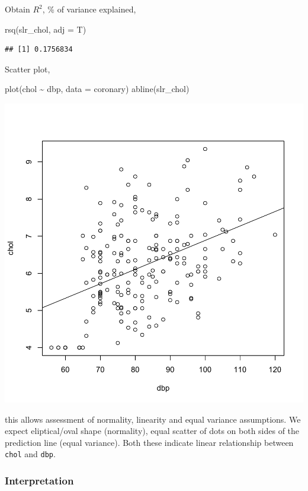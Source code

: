 \documentclass[
]{book}
\makeatletter
\newenvironment{Shaded}{\begin{snugshade}}{\end{snugshade}}
\newcommand{\AttributeTok}[1]{\textcolor[rgb]{0.61,0.61,0.61}{#1}}
\newcommand{\FunctionTok}[1]{\textcolor[rgb]{0,0,0}{#1}}
\newcommand{\NormalTok}[1]{#1}
\newcommand{\SpecialCharTok}[1]{\textcolor[rgb]{0,0,0}{#1}}
\newenvironment{kframe}{%
\medskip{}
\setlength{\fboxsep}{.8em}
 \def\at@end@of@kframe{}%
 \ifinner\ifhmode%
  \def\at@end@of@kframe{\end{minipage}}%
  \begin{minipage}{\columnwidth}%
 \fi\fi%
 \def\FrameCommand##1{\hskip\@totalleftmargin \hskip-\fboxsep
 \colorbox{shadecolor}{##1}\hskip-\fboxsep
     \hskip-\linewidth \hskip-\@totalleftmargin \hskip\columnwidth}%
 \MakeFramed {\advance\hsize-\width
   \@totalleftmargin\z@ \linewidth\hsize
   \@setminipage}}%
 {\par\unskip\endMakeFramed%
 \at@end@of@kframe}
\renewenvironment{Shaded}{\begin{kframe}}{\end{kframe}}
\makeatother
\begin{document}
Obtain \(R^2\), \% of variance explained,

\begin{Shaded}
\begin{Highlighting}[]
\FunctionTok{rsq}\NormalTok{(slr\_chol, }\AttributeTok{adj =}\NormalTok{ T)}
\end{Highlighting}
\end{Shaded}

\begin{verbatim}
## [1] 0.1756834
\end{verbatim}

Scatter plot,

\begin{Shaded}
\begin{Highlighting}[]
\FunctionTok{plot}\NormalTok{(chol }\SpecialCharTok{\textasciitilde{}}\NormalTok{ dbp, }\AttributeTok{data =}\NormalTok{ coronary)}
\FunctionTok{abline}\NormalTok{(slr\_chol)}
\end{Highlighting}
\end{Shaded}

\begin{center}\includegraphics[width=0.7\linewidth,keepaspectratio]{Multivariable_Data_Analysis_files/figure-latex/unnamed-chunk-105-1} \end{center}

this allows assessment of normality, linearity and equal variance assumptions. We expect eliptical/oval shape (normality), equal scatter of dots on both sides of the prediction line (equal variance). Both these indicate linear relationship between \texttt{chol} and \texttt{dbp}.

\hypertarget{interpretation}{%
\subsubsection{Interpretation}\label{interpretation}}
\end{document}
